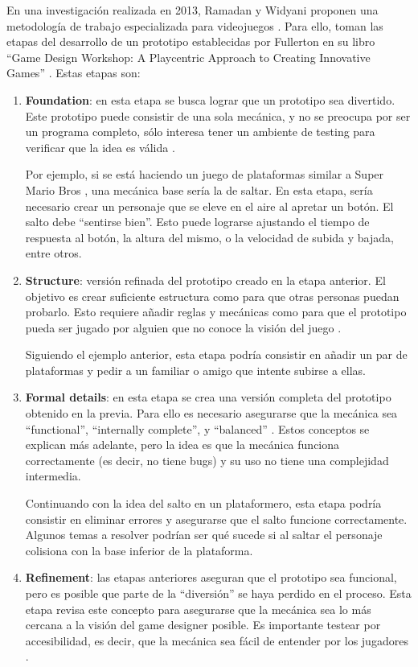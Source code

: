 \par En una investigación realizada en 2013, Ramadan y Widyani proponen una metodología de trabajo especializada para videojuegos \cite{ramadanGameDevelopmentLife2013}. Para ello, toman las etapas del desarrollo de un prototipo establecidas por Fullerton en su libro “Game Design Workshop: A Playcentric Approach to Creating Innovative Games” \cite{fullertonGameDesignWorkshop2008}. Estas etapas son:
\begin{enumerate}
    \item \textbf{Foundation}: en esta etapa se busca lograr que un prototipo sea divertido. Este prototipo puede consistir de una sola mecánica, y no se preocupa por ser un programa completo, sólo interesa tener un ambiente de testing para verificar que la idea es válida \cite{ramadanGameDevelopmentLife2013,fullertonGameDesignWorkshop2008}. \par Por ejemplo, si se está haciendo un juego de plataformas similar a Super Mario Bros \cite{SuperMarioBros2025}, una mecánica base sería la de saltar. En esta etapa, sería necesario crear un personaje que se eleve en el aire al apretar un botón. El salto debe “sentirse bien”. Esto puede lograrse ajustando el tiempo de respuesta al botón, la altura del mismo, o la velocidad de subida y bajada, entre otros.
    \item \textbf{Structure}: versión refinada del prototipo creado en la etapa anterior. El objetivo es crear suficiente estructura como para que otras personas puedan probarlo. Esto requiere añadir reglas y mecánicas como para que el prototipo pueda ser jugado por alguien que no conoce la visión del juego \cite{ramadanGameDevelopmentLife2013,fullertonGameDesignWorkshop2008}. \par Siguiendo el ejemplo anterior, esta etapa podría consistir en añadir un par de plataformas y pedir a un familiar o amigo que intente subirse a ellas.
    \item \textbf{Formal details}:  en esta etapa se crea una versión completa del prototipo obtenido en la previa. Para ello es necesario asegurarse que la mecánica sea “functional”, “internally complete”, y “balanced” \cite{fullertonGameDesignWorkshop2008}. Estos conceptos se explican más adelante, pero la idea es que la mecánica funciona correctamente (es decir, no tiene bugs) y su uso no tiene una complejidad intermedia. \par Continuando con la idea del salto en un plataformero, esta etapa podría consistir en eliminar errores y asegurarse que el salto funcione correctamente. Algunos temas a resolver podrían ser qué sucede si al saltar el personaje colisiona con la base inferior de la plataforma.
    \item \textbf{Refinement}: las etapas anteriores aseguran que el prototipo sea funcional, pero es posible que parte de la “diversión” se haya perdido en el proceso. Esta etapa revisa este concepto para asegurarse que la mecánica sea lo más cercana a la visión del game designer posible. Es importante testear por accesibilidad, es decir, que la mecánica sea fácil de entender por los jugadores \cite{ramadanGameDevelopmentLife2013,fullertonGameDesignWorkshop2008}. 
\end{enumerate}
